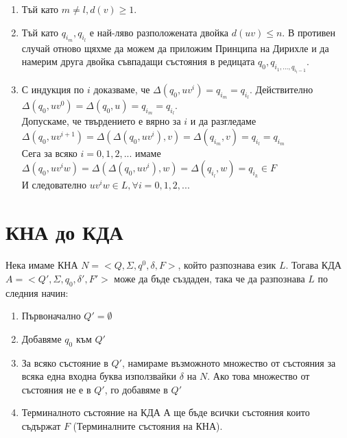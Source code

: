 \documentclass[11pt]{article}
\begin{document}
\renewcommand{\theenumi}{\arabic{enumi}}
\begin{enumerate}
	\item Тъй като $m \neq l, d(v) \geq 1$. 
	\item Тъй като $q_{i_m}, q_{i_l}$ е най-ляво разположената двойка $d(uv) \leq n$. В противен случай отново щяхме да можем да приложим Принципа на Дирихле и да намерим друга двойка съвпадащи състояния в редицата $q_{0}, q_{i_{1},...,q_{i_l-1}}$.
	\item С индукция по $i$ доказваме, че $\Delta(q_{0}, uv^{i}) = q_{i_m} = q_{i_l}$. Действително $\Delta(q_{0}, uv^{0}) = \Delta(q_{0}, u) = q_{i_m} = q_{i_l}$.\\
		Допускаме, че твърдението е вярно за $i$ и да разгледаме $\Delta(q_{0}, uv^{i+1}) = \Delta(\Delta(q_{0}, uv^{i}), v) = \Delta(q_{i_m}, v) = q_{i_l} = q_{i_m}$\\
		Сега за всяко $i = 0, 1, 2, ...$ имаме $\Delta(q_{0}, uv^{i}w) = \Delta(\Delta(q_{0}, uv^{i}), w) = \Delta(q_{i_l}, w) = q_{i_k} \in F$ \\
		И следователно $uv^{i}w \in L, \forall i = 0,1,2,...$
\end{enumerate}   

\section{КНА до КДА}
Нека имаме КНА $N = <Q, \Sigma, q^{0}, \delta, F>$, който разпознава език $L$. Тогава КДА $A = <Q', \Sigma, q_{0}, \delta', F'>$ може да бъде създаден, така че да разпознава $L$ по следния начин: 
\renewcommand{\theenumi}{\arabic{enumi}}
\begin{enumerate}
	\item Първоначално $Q' = \emptyset$
	\item Добавяме $q_{0}$ към $Q'$
	\item За всяко състояние в $Q'$, намираме възможното множество от състояния за всяка една входна буква използвайки $\delta$ на $N$. Ако това множество от състояния не е в $Q'$, го добавяме в $Q'$
	\item Терминалното състояние на КДА $А$ ще бъде всички състояния които съдържат $F$ (Терминалните състояния на КНА).
\end{enumerate}
\end{document}

